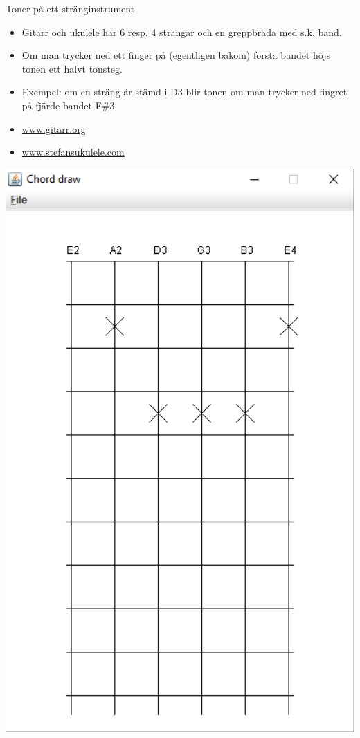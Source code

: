 \begin{Slide}{Toner på ett stränginstrument}
\begin{minipage}{0.5\textwidth}
\begin{itemize}\SlideFontSmall
\item Gitarr och ukulele har 6 resp. 4 strängar och en greppbräda med s.k. band.

\item Om man trycker ned ett finger på (egentligen bakom) första bandet höjs tonen ett halvt tonsteg. 

\item Exempel: om en sträng är stämd i D3 blir tonen om man trycker ned fingret på fjärde bandet F\#3.

\item \href{http://www.gitarr.org}{www.gitarr.org}

\item \href{http://www.stefansukulele.com}{www.stefansukulele.com}

\end{itemize}
\end{minipage}
\begin{minipage}{0.45\textwidth}
\includegraphics[width=1.0\textwidth]{../img/chords/ChordDraw}
\end{minipage}

\end{Slide}

